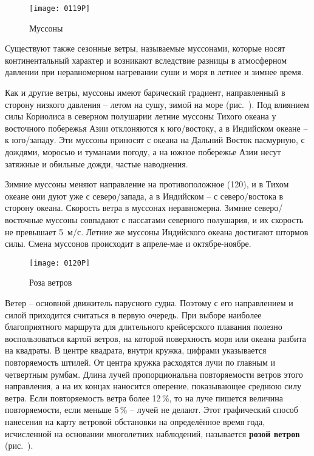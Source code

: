 \begin{figure}[!htb]
  \centering{}
  \texttt{[image: 0119P]}
  \caption{Муссоны}
  \label{fig:119}
\end{figure}

Существуют также сезонные ветры, называемые муссонами, которые носят
континентальный характер и возникают вследствие разницы в атмосферном
давлении при неравномерном нагревании суши и моря в летнее и зимнее
время.

Как и другие ветры, муссоны имеют барический градиент, направленный в
сторону низкого давления \--- летом на сушу, зимой на море
(рис.~). Под влиянием силы Кориолиса в северном полушарии
летние муссоны Тихого океана у восточного побережья Азии отклоняются к
юго\-/востоку, а в Индийском океане \--- к юго\-/западу. Эти муссоны
приносят с океана на Дальний Восток пасмурную, с дождями, моросью и
туманами погоду, а на южное побережье Азии несут затяжные и обильные
дожди, частые наводнения.

Зимние муссоны меняют направление на противоположное (120\gr{}\gr), и в Тихом океане они дуют уже с северо\-/запада, а в
Индийском \--- с северо\-/востока в сторону океана. Скорость ветра в
муссонах неравномерна. Зимние северо\-/восточные муссоны совпадают с
пассатами северного полушария, и их скорость не превышает 5~м/с. Летние же муссоны Индийского океана достигают штормов
силы. Смена муссонов происходит в апреле\--мае и октябре\--ноябре.

\begin{figure}[!htb]
  \centering{}
  \texttt{[image: 0120P]}
  \caption{Роза ветров}
  \label{fig:120}
\end{figure}

Ветер \--- основной движитель парусного судна. Поэтому с его
направлением и силой приходится считаться в первую очередь. При выборе
наиболее благоприятного маршрута для длительного крейсерского плавания
полезно воспользоваться картой ветров, на которой поверхность моря или
океана разбита на квадраты. В центре квадрата, внутри кружка, цифрами
указывается повторяемость штилей. От центра кружка расходятся лучи по
главным и четвертным румбам. Длина лучей пропорциональна повторяемости
ветров этого направления, а на их концах наносится оперение,
показывающее среднюю силу ветра. Если повторяемость ветра более
12\,\%, то на луче пишется величина повторяемости, если меньше 5\,\%
\--- лучей не делают. Этот графический способ нанесения на карту
ветровой обстановки на определённое время года, исчисленной на
основании многолетних наблюдений, называется
\textbf{розой ветров} (рис.~).

